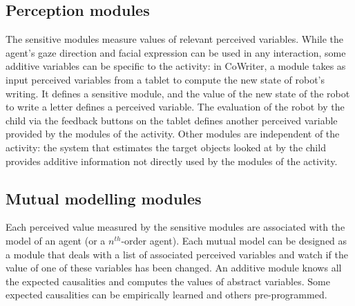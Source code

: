 \documentclass[conference]{IEEEtran}
\begin{document}
\subsection{Perception modules}
\label{ssec:perception}
The sensitive modules measure values of relevant perceived variables. 
While the agent's gaze direction and facial expression can be used in any interaction, some additive variables can be specific to the activity: in CoWriter, a module takes as input perceived variables from a tablet to compute the new state of robot's writing. 
It defines a sensitive module, and the value of the new state of the robot to write a letter defines a perceived variable. 
The evaluation of the robot by the child via the feedback buttons on the tablet defines another perceived variable provided by the modules of the activity. 
Other modules are independent of the activity: the system that estimates the target objects looked at by the child provides additive information not directly used by the modules of the activity.  

\subsection{Mutual modelling modules}
\label{ssec:mmm}
Each perceived value measured by the sensitive modules are associated with the model of an agent (or a $n^{th}$-order agent). Each mutual model can be designed as a module that deals with a list of associated perceived variables and watch if the value of one of these variables has been changed. 
An additive module knows all the expected causalities and computes the values of abstract variables. Some expected causalities can be empirically learned and others pre-programmed. 
\end{document}
